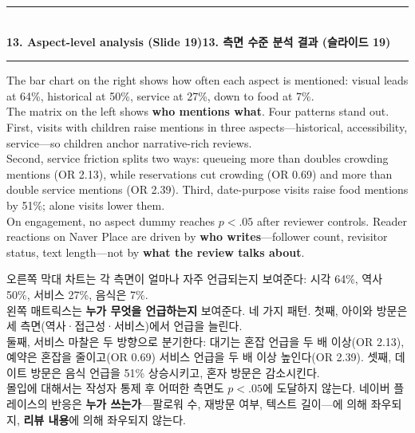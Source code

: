 \documentclass[10pt,a4paper]{article}
\newcommand{\sechead}[2]{%
  \vspace{6pt}%
  \noindent\rule{\linewidth}{0.6pt}\\[1pt]
  {\small\bfseries #1\hfill #2}\\[-3pt]
  \rule{\linewidth}{0.4pt}\par\vspace{2pt}%
}
\newcommand{\sent}[1]{#1\\[5pt]}
\newcommand{\bilingual}[2]{%
  \noindent%
  \begin{minipage}[t]{0.485\linewidth}
    \small #1
  \end{minipage}\hfill\vrule\hfill%
  \begin{minipage}[t]{0.483\linewidth}
    \small #2
  \end{minipage}\par\vspace{4pt}%
}
\begin{document}
\sechead{13. Aspect-level analysis (Slide 19)}{13. 측면 수준 분석 결과 (슬라이드 19)}
\bilingual{%
  \sent{The bar chart on the right shows how often each aspect is mentioned: visual leads at 64\%, historical at 50\%, service at 27\%, down to food at 7\%.}
  \sent{The matrix on the left shows \textbf{who mentions what}. Four patterns stand out. First, visits with children raise mentions in three aspects---historical, accessibility, service---so children anchor narrative-rich reviews.}
  \sent{Second, service friction splits two ways: queueing more than doubles crowding mentions (OR 2.13), while reservations cut crowding (OR 0.69) and more than double service mentions (OR 2.39). Third, date-purpose visits raise food mentions by 51\%; alone visits lower them.}
  \sent{On engagement, no aspect dummy reaches $p<.05$ after reviewer controls. Reader reactions on Naver Place are driven by \textbf{who writes}---follower count, revisitor status, text length---not by \textbf{what the review talks about}.}
}{%
  \sent{오른쪽 막대 차트는 각 측면이 얼마나 자주 언급되는지 보여준다: 시각 64\%, 역사 50\%, 서비스 27\%, 음식은 7\%.}
  \sent{왼쪽 매트릭스는 \textbf{누가 무엇을 언급하는지} 보여준다. 네 가지 패턴. 첫째, 아이와 방문은 세 측면(역사·접근성·서비스)에서 언급을 늘린다.}
  \sent{둘째, 서비스 마찰은 두 방향으로 분기한다: 대기는 혼잡 언급을 두 배 이상(OR 2.13), 예약은 혼잡을 줄이고(OR 0.69) 서비스 언급을 두 배 이상 높인다(OR 2.39). 셋째, 데이트 방문은 음식 언급을 51\% 상승시키고, 혼자 방문은 감소시킨다.}
  \sent{몰입에 대해서는 작성자 통제 후 어떠한 측면도 $p<.05$에 도달하지 않는다. 네이버 플레이스의 반응은 \textbf{누가 쓰는가}---팔로워 수, 재방문 여부, 텍스트 길이---에 의해 좌우되지, \textbf{리뷰 내용}에 의해 좌우되지 않는다.}
}
\end{document}
